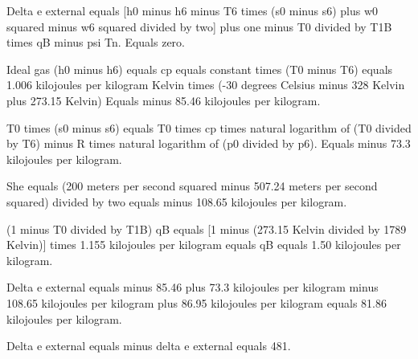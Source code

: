Delta e external equals [h0 minus h6 minus T6 times (s0 minus s6) plus w0 squared minus w6 squared divided by two] plus one minus T0 divided by T1B times qB minus psi Tn.  
Equals zero.  
  
Ideal gas  
(h0 minus h6) equals cp equals constant times (T0 minus T6) equals 1.006 kilojoules per kilogram Kelvin times (-30 degrees Celsius minus 328 Kelvin plus 273.15 Kelvin)  
Equals minus 85.46 kilojoules per kilogram.  
  
T0 times (s0 minus s6) equals T0 times cp times natural logarithm of (T0 divided by T6) minus R times natural logarithm of (p0 divided by p6).  
Equals minus 73.3 kilojoules per kilogram.  
  
She equals (200 meters per second squared minus 507.24 meters per second squared) divided by two equals minus 108.65 kilojoules per kilogram.  
  
(1 minus T0 divided by T1B) qB equals [1 minus (273.15 Kelvin divided by 1789 Kelvin)] times 1.155 kilojoules per kilogram equals qB equals 1.50 kilojoules per kilogram.  
  
Delta e external equals minus 85.46 plus 73.3 kilojoules per kilogram minus 108.65 kilojoules per kilogram plus 86.95 kilojoules per kilogram equals 81.86 kilojoules per kilogram.  
  
Delta e external equals minus delta e external equals 481.